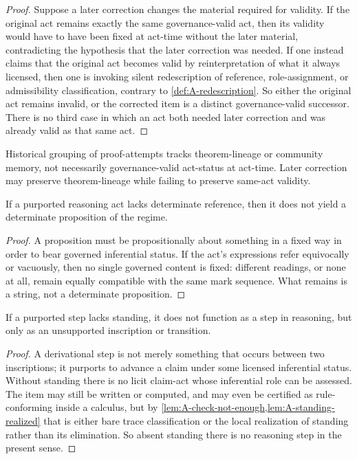 \begin{proof}
Suppose a later correction changes the material required for validity. If the original act remains exactly the same governance-valid act, then its validity would have to have been fixed at act-time without the later material, contradicting the hypothesis that the later correction was needed. If one instead claims that the original act becomes valid by reinterpretation of what it always licensed, then one is invoking silent redescription of reference, role-assignment, or admissibility classification, contrary to \cref{def:A-redescription}. So either the original act remains invalid, or the corrected item is a distinct governance-valid successor. There is no third case in which an act both needed later correction and was already valid as that same act.
\end{proof}

\begin{remark}
Historical grouping of proof-attempts tracks theorem-lineage or community memory, not necessarily governance-valid act-status at act-time. Later correction may preserve theorem-lineage while failing to preserve same-act validity.
\end{remark}

\begin{lemma}
\label{lem:A-reference}
If a purported reasoning act lacks determinate reference, then it does not yield a determinate proposition of the regime.
\end{lemma}

\begin{proof}
A proposition must be propositionally about something in a fixed way in order to bear governed inferential status. If the act's expressions refer equivocally or vacuously, then no single governed content is fixed: different readings, or none at all, remain equally compatible with the same mark sequence. What remains is a string, not a determinate proposition.
\end{proof}

\begin{lemma}
\label{lem:A-standing}
If a purported step lacks standing, it does not function as a step in reasoning, but only as an unsupported inscription or transition.
\end{lemma}

\begin{proof}
A derivational step is not merely something that occurs between two inscriptions; it purports to advance a claim under some licensed inferential status. Without standing there is no licit claim-act whose inferential role can be assessed. The item may still be written or computed, and may even be certified as rule-conforming inside a calculus, but by \cref{lem:A-check-not-enough,lem:A-standing-realized} that is either bare trace classification or the local realization of standing rather than its elimination. So absent standing there is no reasoning step in the present sense.
\end{proof}

